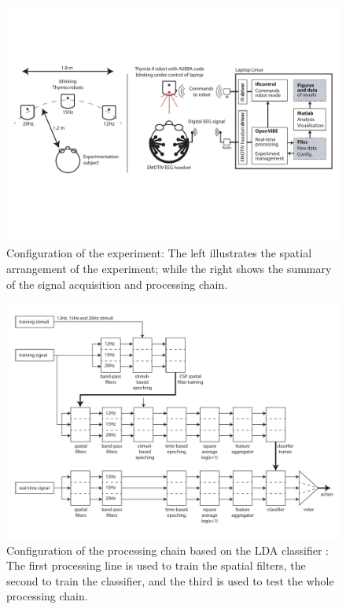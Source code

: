 \documentclass{svmult}
\begin{document}
\begin{figure}
\center
\includegraphics[width=\textwidth]{figures/schema-global.pdf}
\caption{Configuration of the experiment: The left illustrates the spatial arrangement of the experiment; while the right shows the summary of the signal acquisition and processing chain.} \label{fig:thymioinstall}
\end{figure}

\begin{figure}
\center
\includegraphics[width=\textwidth]{figures/schema-openvibe.pdf}
\caption{Configuration of the processing chain based on the LDA classifier : The first processing line is used to train the spatial filters, the second to train the classifier, and the third is used to test the whole processing chain.} \label{fig:LDA}
\end{figure}
\end{document}
